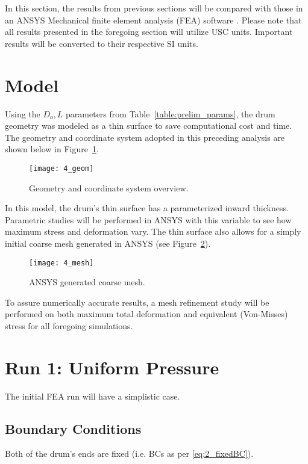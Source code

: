 In this section, the results from previous sections will be compared with those in an ANSYS Mechanical finite element analysis (FEA) software \cite{ANSYS}. Please note that all results presented in the foregoing section will utilize USC units. Important results will be converted to their respective SI units.

\section{Model}

Using the $D_o , L$ parameters from Table~\ref{table:prelim_params}, the drum geometry was modeled as a thin surface to save computational cost and time. The geometry and coordinate system adopted in this preceding analysis are shown below in Figure~\ref{fig:4_geom}.

\begin{figure}[H]
	\centering
	\texttt{[image: 4\_geom]}
	\caption{Geometry and coordinate system overview.}
	\label{fig:4_geom}
\end{figure}

In this model, the drum's thin surface has a parameterized inward thickness. Parametric studies will be performed in ANSYS with this variable to see how maximum stress and deformation vary. The thin surface also allows for a simply initial coarse mesh generated in ANSYS (see Figure~\ref{fig:4_mesh}).

\begin{figure}[H]
	\centering
	\texttt{[image: 4\_mesh]}
	\caption{ANSYS generated coarse mesh.}
	\label{fig:4_mesh}
\end{figure}

To assure numerically accurate results, a mesh refinement study will be performed on both maximum total deformation and equivalent (Von-Misses) stress for all foregoing simulations.



\section{Run 1: Uniform Pressure}

The initial FEA run will have a simplistic case. 

\subsection{Boundary Conditions}
\label{subsection:R1BC}
Both of the drum's ends are fixed (i.e. BCs as per \ref{eq:2_fixedBC}).\\

